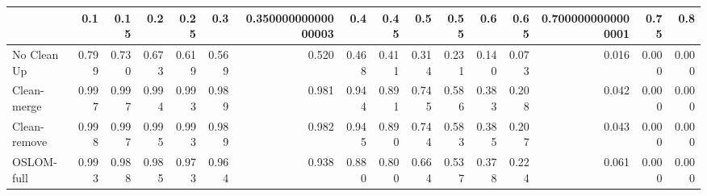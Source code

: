 \begin{tabular}{lrrrrrrrrrrrrrrr}
\toprule
{} &   0.1 &  0.15 &   0.2 &  0.25 &   0.3 & 0.35000000000000003 &   0.4 &  0.45 &   0.5 &  0.55 &   0.6 &  0.65 & 0.7000000000000001 &  0.75 &   0.8 \\
\midrule
No Clean Up  & 0.799 & 0.730 & 0.673 & 0.619 & 0.569 &               0.520 & 0.468 & 0.411 & 0.314 & 0.231 & 0.140 & 0.073 &              0.016 & 0.000 & 0.000 \\
Clean-merge  & 0.997 & 0.997 & 0.994 & 0.993 & 0.989 &               0.981 & 0.944 & 0.891 & 0.745 & 0.586 & 0.383 & 0.208 &              0.042 & 0.000 & 0.000 \\
Clean-remove & 0.998 & 0.997 & 0.995 & 0.993 & 0.989 &               0.982 & 0.945 & 0.890 & 0.744 & 0.583 & 0.385 & 0.207 &              0.043 & 0.000 & 0.000 \\
OSLOM-full   & 0.993 & 0.988 & 0.985 & 0.973 & 0.964 &               0.938 & 0.880 & 0.800 & 0.664 & 0.537 & 0.378 & 0.224 &              0.061 & 0.000 & 0.000 \\
\bottomrule
\end{tabular}
